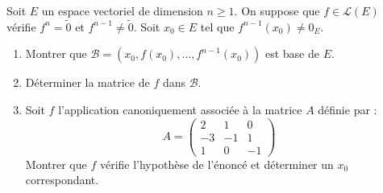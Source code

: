 \documentclass[a4paper,10pt]{report}
\begin{document}
\begin{Exa} Soit $E$ un espace vectoriel de dimension $n \geq 1$. On suppose que $f \in \mathcal{L}(E)$ vérifie $f^n = \tilde{0}$ et $f^{n-1} \neq \tilde{0}$. Soit $x_0 \in E$ tel que $f^{n-1}(x_0) \neq 0_E$.

\begin{enumerate}
\item Montrer que $\mathcal{B}= (x_0, f(x_0), \ldots, f^{n-1}(x_0))$ est base de $E$. 
\item Déterminer la matrice de $f$ dans $\mathcal{B}$.
\item Soit $f$ l'application canoniquement associée à la matrice $A$ définie par :
$$ A = \begin{pmatrix}
2 & 1 & 0 \\
-3 & -1 & 1 \\
1 & 0 & -1 
\end{pmatrix}$$
Montrer que $f$ vérifie l'hypothèse de l'énoncé et déterminer un $x_0$ correspondant.
\end{enumerate}
\end{Exa}

\corr 
\end{document}
